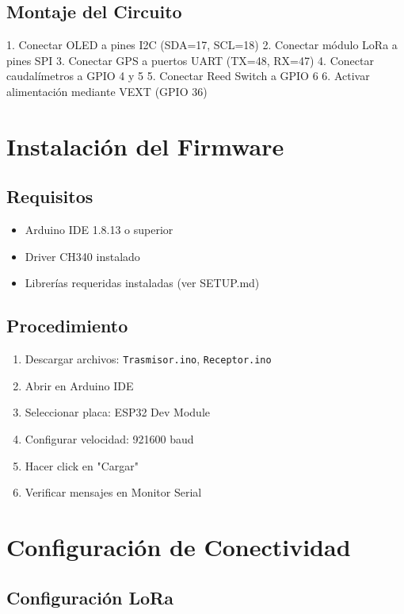\documentclass[12pt,a4paper,oneside]{report}
\begin{document}
\subsection{Montaje del Circuito}

1. Conectar OLED a pines I2C (SDA=17, SCL=18)
2. Conectar módulo LoRa a pines SPI
3. Conectar GPS a puertos UART (TX=48, RX=47)
4. Conectar caudalímetros a GPIO 4 y 5
5. Conectar Reed Switch a GPIO 6
6. Activar alimentación mediante VEXT (GPIO 36)

\section{Instalación del Firmware}

\subsection{Requisitos}

\begin{itemize}
    \item Arduino IDE 1.8.13 o superior
    \item Driver CH340 instalado
    \item Librerías requeridas instaladas (ver SETUP.md)
\end{itemize}

\subsection{Procedimiento}

\begin{enumerate}
    \item Descargar archivos: \texttt{Trasmisor.ino}, \texttt{Receptor.ino}
    \item Abrir en Arduino IDE
    \item Seleccionar placa: ESP32 Dev Module
    \item Configurar velocidad: 921600 baud
    \item Hacer click en "Cargar"
    \item Verificar mensajes en Monitor Serial
\end{enumerate}

\section{Configuración de Conectividad}

\subsection{Configuración LoRa}
\end{document}
